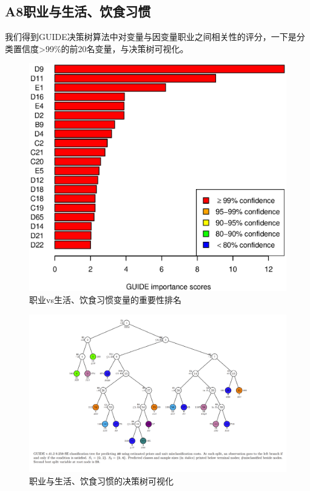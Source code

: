 \documentclass{article}
\begin{document}
\begin{CJK}{UTF8}{gbsn}
\subsection{A8职业与生活、饮食习惯}
我们得到GUIDE决策树算法中对变量与因变量职业之间相关性的评分，一下是分类置信度>99\%的前20名变量，与决策树可视化。
\begin{figure}[htbp]
    \flushleft
    \includegraphics[scale=0.7]{A8_imp.eps}
    \caption{职业vs生活、饮食习惯变量的重要性排名}
    \label{}
\end{figure}
\begin{figure}[htbp]
    \flushleft
    \includegraphics[scale=0.45]{A8_tree.png}
    \caption{职业与生活、饮食习惯的决策树可视化}
    \label{}
\end{figure}


\end{CJK}
\end{document}
